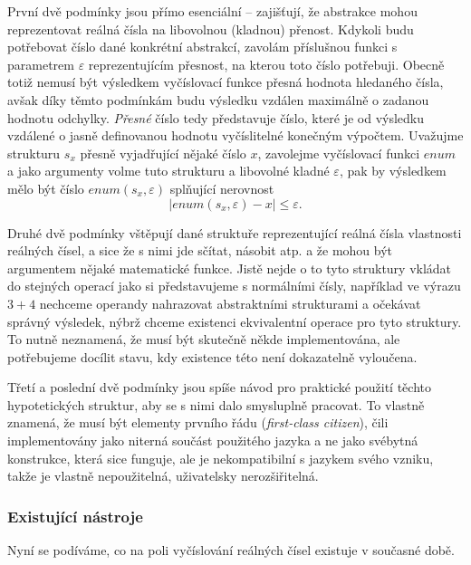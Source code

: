 První dvě podmínky jsou přímo esenciální -- zajišťují, že abstrakce mohou reprezentovat reálná čísla na libovolnou (kladnou) přenost. Kdykoli budu potřebovat číslo dané konkrétní abstrakcí, zavolám příslušnou funkci s parametrem $\varepsilon$ reprezentujícím přesnost, na kterou toto číslo potřebuji. Obecně totiž nemusí být výsledkem vyčíslovací funkce přesná hodnota hledaného čísla, avšak díky těmto podmínkám budu výsledku vzdálen maximálně o zadanou hodnotu odchylky. \textit{Přesné} číslo tedy představuje číslo, které je od výsledku vzdálené o jasně definovanou hodnotu vyčíslitelné konečným výpočtem. Uvažujme strukturu $s_x$ přesně vyjadřující nějaké číslo $x$, zavolejme vyčíslovací funkci $enum$ a jako argumenty volme tuto strukturu a libovolné kladné $\varepsilon$, pak by výsledkem mělo být číslo $enum(s_x, \varepsilon)$ splňující nerovnost
\begin{equation}
|enum(s_x, \varepsilon)-x| \leq \varepsilon.
\end{equation}

Druhé dvě podmínky vštěpují dané struktuře reprezentující reálná čísla vlastnosti reálných čísel, a sice že s nimi jde sčítat, násobit atp. a že mohou být argumentem nějaké matematické funkce. Jistě nejde o to tyto struktury vkládat do stejných operací jako si představujeme s normálními čísly, například ve výrazu $3+4$ nechceme operandy nahrazovat abstraktními strukturami a očekávat správný výsledek, nýbrž chceme existenci ekvivalentní operace pro tyto struktury. To nutně neznamená, že musí být skutečně někde implementována, ale potřebujeme docílit stavu, kdy existence této není dokazatelně vyloučena.

Třetí a poslední dvě podmínky jsou spíše návod pro praktické použití těchto hypotetických struktur, aby se s nimi dalo smysluplně pracovat. To vlastně znamená, že musí být elementy prvního řádu (\textit{first-class citizen}), čili implementovány jako niterná součást použitého jazyka a ne jako svébytná konstrukce, která sice funguje, ale je nekompatibilní s jazykem svého vzniku, takže je vlastně nepoužitelná, uživatelsky nerozšiřitelná.

\subsubsection{Existující nástroje}\FloatBarrier
Nyní se podíváme, co na poli vyčíslování reálných čísel existuje v současné době.
